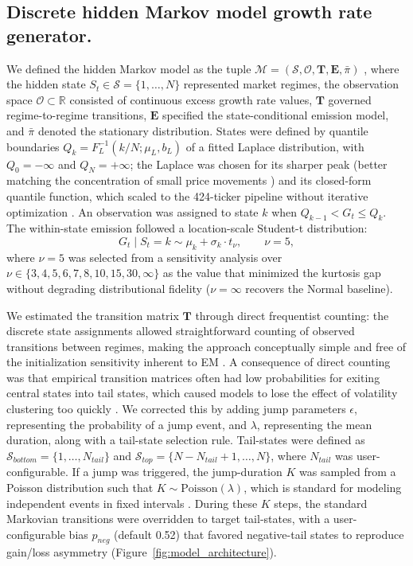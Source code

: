 \subsection*{Discrete hidden Markov model growth rate generator.}
We defined the hidden Markov model as the tuple $\mathcal{M} = (\mathcal{S}, \mathcal{O}, \mathbf{T}, \mathbf{E}, \bar{\pi})$ \cite{rabiner_introduction_1986}, where the hidden state $S_t \in \mathcal{S} = \{1,\dots,N\}$ represented market regimes, the observation space $\mathcal{O} \subset \mathbb{R}$ consisted of continuous excess growth rate values, $\mathbf{T}$ governed regime-to-regime transitions, $\mathbf{E}$ specified the state-conditional emission model, and $\bar{\pi}$ denoted the stationary distribution. States were defined by quantile boundaries $Q_k = F_L^{-1}(k/N; \mu_L, b_L)$ of a fitted Laplace distribution, with $Q_0 = -\infty$ and $Q_N = +\infty$; the Laplace was chosen for its sharper peak (better matching the concentration of small price movements \cite{mandelbrot_variation_1963, cont_empirical_2001, kotz_laplace_2001}) and its closed-form quantile function, which scaled to the 424-ticker pipeline without iterative optimization \cite{bilmes_gentle_nodate}. An observation was assigned to state $k$ when $Q_{k-1} < G_t \le Q_k$. The within-state emission followed a location-scale Student-t distribution:
\begin{equation}
    G_t \mid S_t = k \sim \mu_k + \sigma_k \cdot t_{\nu}, \qquad \nu = 5,
\end{equation}
where $\nu=5$ was selected from a sensitivity analysis over $\nu\in\{3,4,5,6,7,8,10,15,30,\infty\}$ as the value that minimized the kurtosis gap without degrading distributional fidelity ($\nu=\infty$ recovers the Normal baseline).

We estimated the transition matrix $\mathbf{T}$ through direct frequentist counting: the discrete state assignments allowed straightforward counting of observed transitions between regimes, making the approach conceptually simple and free of the initialization sensitivity inherent to EM \cite{bilmes_gentle_nodate}. A consequence of direct counting was that empirical transition matrices often had low probabilities for exiting central states into tail states, which caused models to lose the effect of volatility clustering too quickly \cite{bulla_stylized_2006}. We corrected this by adding jump parameters $\epsilon$, representing the probability of a jump event, and $\lambda$, representing the mean duration, along with a tail-state selection rule. Tail-states were defined as $\mathcal{S}_{bottom} = \{1, \dots, N_{tail}\}$ and $\mathcal{S}_{top} = \{N-N_{tail}+1, \dots, N\}$, where $N_{tail}$ was user-configurable. If a jump was triggered, the jump-duration $K$ was sampled from a Poisson distribution such that $K \sim \text{Poisson}(\lambda)$, which is standard for modeling independent events in fixed intervals \cite{glasserman_monte_2003}. During these $K$ steps, the standard Markovian transitions were overridden to target tail-states, with a user-configurable bias $p_{neg}$ (default 0.52) that favored negative-tail states to reproduce gain/loss asymmetry (Figure~\ref{fig:model_architecture}).

